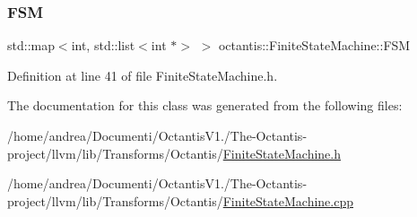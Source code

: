 \subsubsection{\texorpdfstring{F\+SM}{FSM}}
{\footnotesize\ttfamily std\+::map$<$int, std\+::list$<$int $\ast$$>$ $>$ octantis\+::\+Finite\+State\+Machine\+::\+F\+SM}



Definition at line 41 of file Finite\+State\+Machine.\+h.



The documentation for this class was generated from the following files\+:\begin{DoxyCompactItemize}
\item 
/home/andrea/\+Documenti/\+Octantis\+V1./\+The-\/\+Octantis-\/project/llvm/lib/\+Transforms/\+Octantis/\hyperlink{FiniteStateMachine_8h}{Finite\+State\+Machine.\+h}\item 
/home/andrea/\+Documenti/\+Octantis\+V1./\+The-\/\+Octantis-\/project/llvm/lib/\+Transforms/\+Octantis/\hyperlink{FiniteStateMachine_8cpp}{Finite\+State\+Machine.\+cpp}\end{DoxyCompactItemize}
